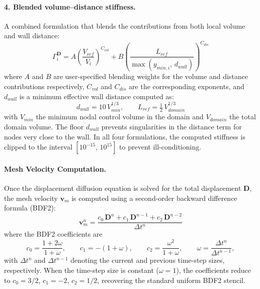 \documentclass[12pt]{extarticle}
\newcommand{\<}{\langle}
\renewcommand{\>}{\rangle}
\theoremstyle{definition}
\begin{document}
\paragraph{4. Blended volume--distance stiffness.}
A combined formulation that blends the contributions from both local volume and wall distance:
\begin{equation}
    \Gamma^{\textbf{D}}_i = A\left(\frac{V_{ref}}{V_i}\right)^{C_{vol}} + B\left(\frac{L_{ref}}{\max(y_{min,i},\,d_{wall})}\right)^{C_{dis}}
\end{equation}
where $A$ and $B$ are user-specified blending weights for the volume and distance contributions respectively, $C_{vol}$ and $C_{dis}$ are the corresponding exponents, and $d_{wall}$ is a minimum effective wall distance computed as:
\begin{equation}
    d_{wall} = 10\,V_{min}^{1/3}, \qquad L_{ref} = \tfrac{1}{2}\,V_{domain}^{1/3}
\end{equation}
with $V_{min}$ the minimum nodal control volume in the domain and $V_{domain}$ the total domain volume. The floor $d_{wall}$ prevents singularities in the distance term for nodes very close to the wall. In all four formulations, the computed stiffness is clipped to the interval $[10^{-15},\,10^{15}]$ to prevent ill-conditioning.

\paragraph{Mesh Velocity Computation.}
Once the displacement diffusion equation is solved for the total displacement $\textbf{D}$, the mesh velocity $\textbf{v}_m$ is computed using a second-order backward difference formula (BDF2):
\begin{equation}
    \textbf{v}_{m}^{n} = \frac{c_0\,\textbf{D}^{n} + c_1\,\textbf{D}^{n-1} + c_2\,\textbf{D}^{n-2}}{\Delta t^n}
    \label{eq:mesh_velocity_bdf2}
\end{equation}
where the BDF2 coefficients are
\begin{equation}
    c_0 = \frac{1+2\omega}{1+\omega},\qquad
    c_1 = -(1+\omega),\qquad
    c_2 = \frac{\omega^2}{1+\omega},\qquad
    \omega = \frac{\Delta t^n}{\Delta t^{n-1}},
\end{equation}
with $\Delta t^n$ and $\Delta t^{n-1}$ denoting the current and previous time-step sizes, respectively. When the time-step size is constant ($\omega=1$), the coefficients reduce to $c_0=3/2$, $c_1=-2$, $c_2=1/2$, recovering the standard uniform BDF2 stencil.
\end{document}
